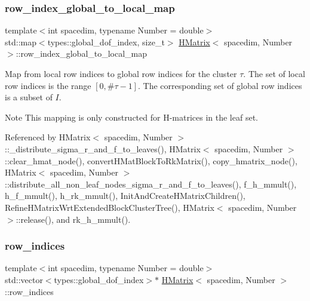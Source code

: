 \mbox{\label{classHMatrix_a4d64145335fc0521603b206a22a67578}} 
\subsubsection{\texorpdfstring{row\+\_\+index\+\_\+global\+\_\+to\+\_\+local\+\_\+map}{row\_index\_global\_to\_local\_map}}
{\footnotesize\ttfamily template$<$int spacedim, typename Number = double$>$ \\
std\+::map$<$types\+::global\+\_\+dof\+\_\+index, size\+\_\+t$>$ \hyperlink{classHMatrix}{H\+Matrix}$<$ spacedim, Number $>$\+::row\+\_\+index\+\_\+global\+\_\+to\+\_\+local\+\_\+map\hspace{0.3cm}{\ttfamily [private]}}

Map from local row indices to global row indices for the cluster $\tau$. The set of local row indices is the range $[0, \#\tau - 1]$. The corresponding set of global row indices is a subset of $I$.


\begin{DoxyDescription}
\item[Note ]This mapping is only constructed for H-\/matrices in the leaf set. 
\end{DoxyDescription}

Referenced by H\+Matrix$<$ spacedim, Number $>$\+::\+\_\+distribute\+\_\+sigma\+\_\+r\+\_\+and\+\_\+f\+\_\+to\+\_\+leaves(), H\+Matrix$<$ spacedim, Number $>$\+::clear\+\_\+hmat\+\_\+node(), convert\+H\+Mat\+Block\+To\+Rk\+Matrix(), copy\+\_\+hmatrix\+\_\+node(), H\+Matrix$<$ spacedim, Number $>$\+::distribute\+\_\+all\+\_\+non\+\_\+leaf\+\_\+nodes\+\_\+sigma\+\_\+r\+\_\+and\+\_\+f\+\_\+to\+\_\+leaves(), f\+\_\+h\+\_\+mmult(), h\+\_\+f\+\_\+mmult(), h\+\_\+rk\+\_\+mmult(), Init\+And\+Create\+H\+Matrix\+Children(), Refine\+H\+Matrix\+Wrt\+Extended\+Block\+Cluster\+Tree(), H\+Matrix$<$ spacedim, Number $>$\+::release(), and rk\+\_\+h\+\_\+mmult().

\mbox{\label{classHMatrix_a33b3a936f1b40e320e96d47471da07ae}} 
\subsubsection{\texorpdfstring{row\+\_\+indices}{row\_indices}}
{\footnotesize\ttfamily template$<$int spacedim, typename Number = double$>$ \\
std\+::vector$<$types\+::global\+\_\+dof\+\_\+index$>$$\ast$ \hyperlink{classHMatrix}{H\+Matrix}$<$ spacedim, Number $>$\+::row\+\_\+indices\hspace{0.3cm}{\ttfamily [private]}}

